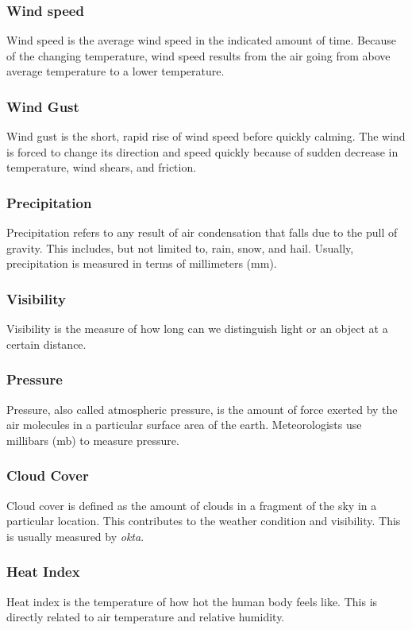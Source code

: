 \subsubsection{Wind speed}
Wind speed is the average wind speed in the indicated amount of time. Because of the changing temperature, wind speed results from the air going from above average temperature to a lower temperature. 

\subsubsection{Wind Gust}
Wind gust is the short, rapid rise of wind speed before quickly calming. The wind is forced to change its direction and speed quickly because of sudden decrease in temperature,  wind shears, and friction.

\subsubsection{Precipitation}
Precipitation refers to any result of air condensation that falls due to the pull of gravity. This includes, but not limited to, rain, snow, and hail. Usually, precipitation is measured in terms of millimeters (mm).

\subsubsection{Visibility}
Visibility is the measure of how long can we distinguish light or an object at a certain distance.  

\subsubsection{Pressure}
Pressure, also called atmospheric pressure, is the amount of force exerted by the air molecules in a particular surface area of the earth. Meteorologists use millibars (mb) to measure pressure. 

\subsubsection{Cloud Cover}
Cloud cover is defined as the amount of clouds in a fragment of the sky in a particular location. This contributes to the weather condition and visibility. This is usually measured by \textit{okta}.

\subsubsection{Heat Index}
Heat index is the temperature of how hot the human body feels like. This is directly related to air temperature and relative humidity. 

